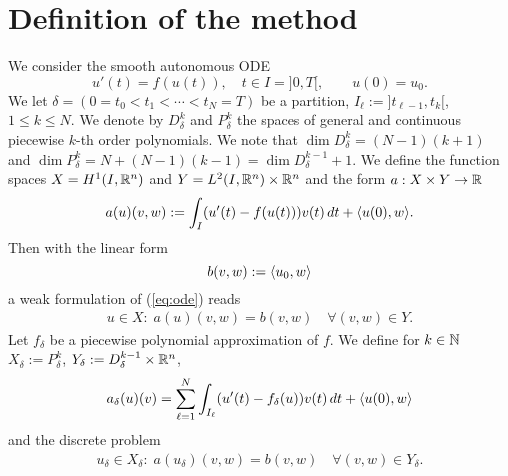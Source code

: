 \documentclass[english,12pt,a4paper]{article}
\begin{document}
\section{Definition of the method}\label{sec:}
%
We consider the smooth autonomous ODE
%
\begin{equation}\label{eq:ode}
u'(t) = f(u(t)),\quad t\in I=]0,T[,\qquad u(0) = u_0.
\end{equation}
%
We let $\delta=(0=t_0<t_1<\cdots < t_N=T)$ be a partition, $I_{\ell}:=]t_{\ell-1},t_k[$, $1\le k\le N$. We denote by $D^k_{\delta}$ and $P^k_{\delta}$ the spaces of general and continuous piecewise $k$-th order polynomials. We note that
$\dim D^k_{\delta} = (N-1)(k+1)$ and $\dim P^k_{\delta} = N + (N-1)(k-1) = \dim D^{k-1}_{\delta}+1$. We define the function spaces $X=H^1(I,\mathbb R^n)$ and $Y=L^2(I,\mathbb R^n)\times \mathbb R^n$ and the form
$a:X\times Y\to \mathbb R$
%
\begin{equation}\label{eq:ode_form}
a(u)(v,w) := \int_I(u'(t) - f(u(t)))v(t)\, dt + \langle u(0),w\rangle.
\end{equation}
%
Then with the linear form
%
\begin{equation}\label{eq:}
b(v,w) := \langle u_0,w\rangle
\end{equation}
%
a weak formulation of (\ref{eq:ode}) reads
%
\begin{align*}
u\in X:\; a(u)(v,w) = b(v,w)\quad \forall (v,w)\in Y.
\end{align*}
%
Let $f_{\delta}$ be a piecewise polynomial approximation of $f$. We define for $k\in \mathbb N$ $X_{\delta}:=P^k_{\delta}$, $Y_{\delta}:=D^{k-1}_{\delta}\times \mathbb R^n$,
%
\begin{equation}\label{eq:}
a_{\delta}(u)(v) = \sum_{\ell=1}^N\int_{I_{\ell}}(u'(t) - f_{\delta}(u))v(t)\, dt + \langle u(0),w\rangle
\end{equation}
%
and the discrete problem
%
\begin{align*}
u_{\delta}\in X_{\delta}:\; a(u_{\delta})(v,w) = b(v,w)\quad \forall (v,w)\in Y_{\delta}.
\end{align*}
%
%
\end{document}
